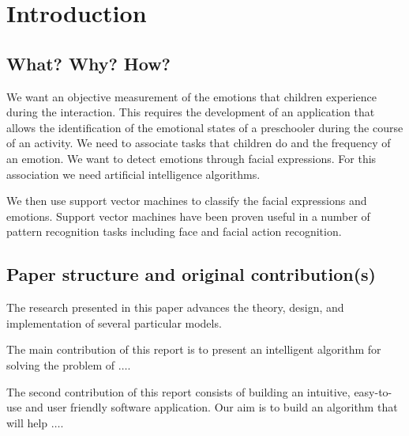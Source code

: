 \documentclass[runningheads,a4paper,11pt]{report}
\begin{document}
\tableofcontents

\newpage

\listoftables
\listoffigures
\listofalgorithms

\newpage




\newpage



 


\chapter{Introduction}
\label{chapter:introduction}

\section{What? Why? How?}
\label{section:what}

We want an objective measurement of the emotions that children experience during the interaction. This requires the development of an application that allows the identification of the emotional states of a preschooler during the course of an activity. We need to associate tasks that children do and the frequency of an emotion.
We want to detect emotions through facial expressions. For this association we need artificial intelligence algorithms. 

We then use support vector machines to classify the facial expressions and emotions.
Support vector machines have been proven useful in a number of pattern recognition tasks including face and facial action recognition.

\section{Paper structure and original contribution(s)}
\label{section:structure}

The research presented in this paper advances the theory, design, and implementation of several particular models. 

The main contribution of this report is to present an intelligent algorithm for solving the problem of $\ldots$.

The second contribution of this report consists of building an intuitive, easy-to-use and user
friendly software application. Our aim is to build an algorithm that will help $\ldots$.
\end{document}

